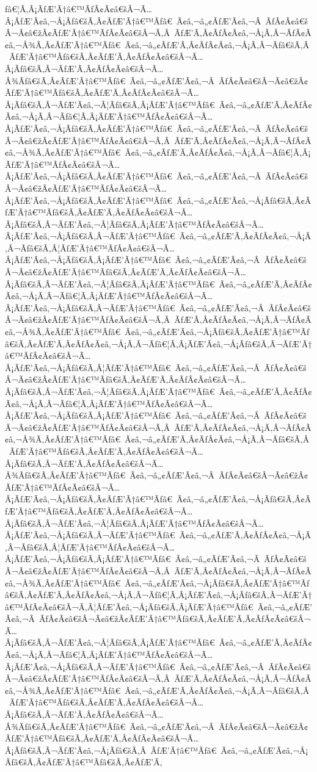 \documentclass{article}
\begin{document}
\begin{outline}[enumerate]
ƒâ€¦Ã‚Â¡ÃƒÆ’Ã†â€™ÃƒÂ¢Ã¢â€šÂ¬Ã…Â¡ÃƒÆ’Ã¢â‚¬Å¡Ãƒâ€šÃ‚Â¢ÃƒÆ’Ã†â€™Ãƒâ€ Ã¢â‚¬â„¢ÃƒÆ’Ã¢â‚¬Â ÃƒÂ¢Ã¢â€šÂ¬Ã¢â€žÂ¢ÃƒÆ’Ã†â€™ÃƒÂ¢Ã¢â€šÂ¬Ã‚Â ÃƒÆ’Ã‚Â¢ÃƒÂ¢Ã¢â‚¬Å¡Ã‚Â¬ÃƒÂ¢Ã¢â‚¬Å¾Ã‚Â¢ÃƒÆ’Ã†â€™Ãƒâ€ Ã¢â‚¬â„¢ÃƒÆ’Ã‚Â¢ÃƒÂ¢Ã¢â‚¬Å¡Ã‚Â¬Ãƒâ€šÃ‚Â ÃƒÆ’Ã†â€™Ãƒâ€šÃ‚Â¢ÃƒÆ’Ã‚Â¢ÃƒÂ¢Ã¢â€šÂ¬Ã…Â¡Ãƒâ€šÃ‚Â¬ÃƒÆ’Ã‚Â¢ÃƒÂ¢Ã¢â€šÂ¬Ã…Â¾Ãƒâ€šÃ‚Â¢ÃƒÆ’Ã†â€™Ãƒâ€ Ã¢â‚¬â„¢ÃƒÆ’Ã¢â‚¬Â ÃƒÂ¢Ã¢â€šÂ¬Ã¢â€žÂ¢ÃƒÆ’Ã†â€™Ãƒâ€šÃ‚Â¢ÃƒÆ’Ã‚Â¢ÃƒÂ¢Ã¢â€šÂ¬Ã…Â¡Ãƒâ€šÃ‚Â¬ÃƒÆ’Ã¢â‚¬Â¦Ãƒâ€šÃ‚Â¡ÃƒÆ’Ã†â€™Ãƒâ€ Ã¢â‚¬â„¢ÃƒÆ’Ã‚Â¢ÃƒÂ¢Ã¢â‚¬Å¡Ã‚Â¬Ãƒâ€¦Ã‚Â¡ÃƒÆ’Ã†â€™ÃƒÂ¢Ã¢â€šÂ¬Ã…Â¡ÃƒÆ’Ã¢â‚¬Å¡Ãƒâ€šÃ‚Â¢ÃƒÆ’Ã†â€™Ãƒâ€ Ã¢â‚¬â„¢ÃƒÆ’Ã¢â‚¬Â ÃƒÂ¢Ã¢â€šÂ¬Ã¢â€žÂ¢ÃƒÆ’Ã†â€™ÃƒÂ¢Ã¢â€šÂ¬Ã‚Â ÃƒÆ’Ã‚Â¢ÃƒÂ¢Ã¢â‚¬Å¡Ã‚Â¬ÃƒÂ¢Ã¢â‚¬Å¾Ã‚Â¢ÃƒÆ’Ã†â€™Ãƒâ€ Ã¢â‚¬â„¢ÃƒÆ’Ã‚Â¢ÃƒÂ¢Ã¢â‚¬Å¡Ã‚Â¬Ãƒâ€¦Ã‚Â¡ÃƒÆ’Ã†â€™ÃƒÂ¢Ã¢â€šÂ¬Ã…Â¡ÃƒÆ’Ã¢â‚¬Å¡Ãƒâ€šÃ‚Â¢ÃƒÆ’Ã†â€™Ãƒâ€ Ã¢â‚¬â„¢ÃƒÆ’Ã¢â‚¬Â ÃƒÂ¢Ã¢â€šÂ¬Ã¢â€žÂ¢ÃƒÆ’Ã†â€™ÃƒÂ¢Ã¢â€šÂ¬Ã…Â¡ÃƒÆ’Ã¢â‚¬Å¡Ãƒâ€šÃ‚Â¢ÃƒÆ’Ã†â€™Ãƒâ€ Ã¢â‚¬â„¢ÃƒÆ’Ã¢â‚¬Å¡Ãƒâ€šÃ‚Â¢ÃƒÆ’Ã†â€™Ãƒâ€šÃ‚Â¢ÃƒÆ’Ã‚Â¢ÃƒÂ¢Ã¢â€šÂ¬Ã…Â¡Ãƒâ€šÃ‚Â¬ÃƒÆ’Ã¢â‚¬Â¦Ãƒâ€šÃ‚Â¡ÃƒÆ’Ã†â€™ÃƒÂ¢Ã¢â€šÂ¬Ã…Â¡ÃƒÆ’Ã¢â‚¬Å¡Ãƒâ€šÃ‚Â¬ÃƒÆ’Ã†â€™Ãƒâ€ Ã¢â‚¬â„¢ÃƒÆ’Ã‚Â¢ÃƒÂ¢Ã¢â‚¬Å¡Ã‚Â¬Ãƒâ€šÃ‚Â¦ÃƒÆ’Ã†â€™ÃƒÂ¢Ã¢â€šÂ¬Ã…Â¡ÃƒÆ’Ã¢â‚¬Å¡Ãƒâ€šÃ‚Â¡ÃƒÆ’Ã†â€™Ãƒâ€ Ã¢â‚¬â„¢ÃƒÆ’Ã¢â‚¬Â ÃƒÂ¢Ã¢â€šÂ¬Ã¢â€žÂ¢ÃƒÆ’Ã†â€™Ãƒâ€šÃ‚Â¢ÃƒÆ’Ã‚Â¢ÃƒÂ¢Ã¢â€šÂ¬Ã…Â¡Ãƒâ€šÃ‚Â¬ÃƒÆ’Ã¢â‚¬Â¦Ãƒâ€šÃ‚Â¡ÃƒÆ’Ã†â€™Ãƒâ€ Ã¢â‚¬â„¢ÃƒÆ’Ã‚Â¢ÃƒÂ¢Ã¢â‚¬Å¡Ã‚Â¬Ãƒâ€¦Ã‚Â¡ÃƒÆ’Ã†â€™ÃƒÂ¢Ã¢â€šÂ¬Ã…Â¡ÃƒÆ’Ã¢â‚¬Å¡Ãƒâ€šÃ‚Â¬ÃƒÆ’Ã†â€™Ãƒâ€ Ã¢â‚¬â„¢ÃƒÆ’Ã¢â‚¬Â ÃƒÂ¢Ã¢â€šÂ¬Ã¢â€žÂ¢ÃƒÆ’Ã†â€™ÃƒÂ¢Ã¢â€šÂ¬Ã‚Â ÃƒÆ’Ã‚Â¢ÃƒÂ¢Ã¢â‚¬Å¡Ã‚Â¬ÃƒÂ¢Ã¢â‚¬Å¾Ã‚Â¢ÃƒÆ’Ã†â€™Ãƒâ€ Ã¢â‚¬â„¢ÃƒÆ’Ã¢â‚¬Å¡Ãƒâ€šÃ‚Â¢ÃƒÆ’Ã†â€™Ãƒâ€šÃ‚Â¢ÃƒÆ’Ã‚Â¢ÃƒÂ¢Ã¢â‚¬Å¡Ã‚Â¬Ãƒâ€¦Ã‚Â¡ÃƒÆ’Ã¢â‚¬Å¡Ãƒâ€šÃ‚Â¬ÃƒÆ’Ã†â€™ÃƒÂ¢Ã¢â€šÂ¬Ã…Â¡ÃƒÆ’Ã¢â‚¬Å¡Ãƒâ€šÃ‚Â¦ÃƒÆ’Ã†â€™Ãƒâ€ Ã¢â‚¬â„¢ÃƒÆ’Ã¢â‚¬Â ÃƒÂ¢Ã¢â€šÂ¬Ã¢â€žÂ¢ÃƒÆ’Ã†â€™Ãƒâ€šÃ‚Â¢ÃƒÆ’Ã‚Â¢ÃƒÂ¢Ã¢â€šÂ¬Ã…Â¡Ãƒâ€šÃ‚Â¬ÃƒÆ’Ã¢â‚¬Â¦Ãƒâ€šÃ‚Â¡ÃƒÆ’Ã†â€™Ãƒâ€ Ã¢â‚¬â„¢ÃƒÆ’Ã‚Â¢ÃƒÂ¢Ã¢â‚¬Å¡Ã‚Â¬Ãƒâ€¦Ã‚Â¡ÃƒÆ’Ã†â€™ÃƒÂ¢Ã¢â€šÂ¬Ã…Â¡ÃƒÆ’Ã¢â‚¬Å¡Ãƒâ€šÃ‚Â¡ÃƒÆ’Ã†â€™Ãƒâ€ Ã¢â‚¬â„¢ÃƒÆ’Ã¢â‚¬Â ÃƒÂ¢Ã¢â€šÂ¬Ã¢â€žÂ¢ÃƒÆ’Ã†â€™ÃƒÂ¢Ã¢â€šÂ¬Ã‚Â ÃƒÆ’Ã‚Â¢ÃƒÂ¢Ã¢â‚¬Å¡Ã‚Â¬ÃƒÂ¢Ã¢â‚¬Å¾Ã‚Â¢ÃƒÆ’Ã†â€™Ãƒâ€ Ã¢â‚¬â„¢ÃƒÆ’Ã‚Â¢ÃƒÂ¢Ã¢â‚¬Å¡Ã‚Â¬Ãƒâ€šÃ‚Â ÃƒÆ’Ã†â€™Ãƒâ€šÃ‚Â¢ÃƒÆ’Ã‚Â¢ÃƒÂ¢Ã¢â€šÂ¬Ã…Â¡Ãƒâ€šÃ‚Â¬ÃƒÆ’Ã‚Â¢ÃƒÂ¢Ã¢â€šÂ¬Ã…Â¾Ãƒâ€šÃ‚Â¢ÃƒÆ’Ã†â€™Ãƒâ€ Ã¢â‚¬â„¢ÃƒÆ’Ã¢â‚¬Â ÃƒÂ¢Ã¢â€šÂ¬Ã¢â€žÂ¢ÃƒÆ’Ã†â€™ÃƒÂ¢Ã¢â€šÂ¬Ã…Â¡ÃƒÆ’Ã¢â‚¬Å¡Ãƒâ€šÃ‚Â¢ÃƒÆ’Ã†â€™Ãƒâ€ Ã¢â‚¬â„¢ÃƒÆ’Ã¢â‚¬Å¡Ãƒâ€šÃ‚Â¢ÃƒÆ’Ã†â€™Ãƒâ€šÃ‚Â¢ÃƒÆ’Ã‚Â¢ÃƒÂ¢Ã¢â€šÂ¬Ã…Â¡Ãƒâ€šÃ‚Â¬ÃƒÆ’Ã¢â‚¬Â¦Ãƒâ€šÃ‚Â¡ÃƒÆ’Ã†â€™ÃƒÂ¢Ã¢â€šÂ¬Ã…Â¡ÃƒÆ’Ã¢â‚¬Å¡Ãƒâ€šÃ‚Â¬ÃƒÆ’Ã†â€™Ãƒâ€ Ã¢â‚¬â„¢ÃƒÆ’Ã‚Â¢ÃƒÂ¢Ã¢â‚¬Å¡Ã‚Â¬Ãƒâ€šÃ‚Â¦ÃƒÆ’Ã†â€™ÃƒÂ¢Ã¢â€šÂ¬Ã…Â¡ÃƒÆ’Ã¢â‚¬Å¡Ãƒâ€šÃ‚Â¡ÃƒÆ’Ã†â€™Ãƒâ€ Ã¢â‚¬â„¢ÃƒÆ’Ã¢â‚¬Â ÃƒÂ¢Ã¢â€šÂ¬Ã¢â€žÂ¢ÃƒÆ’Ã†â€™ÃƒÂ¢Ã¢â€šÂ¬Ã‚Â ÃƒÆ’Ã‚Â¢ÃƒÂ¢Ã¢â‚¬Å¡Ã‚Â¬ÃƒÂ¢Ã¢â‚¬Å¾Ã‚Â¢ÃƒÆ’Ã†â€™Ãƒâ€ Ã¢â‚¬â„¢ÃƒÆ’Ã¢â‚¬Å¡Ãƒâ€šÃ‚Â¢ÃƒÆ’Ã†â€™Ãƒâ€šÃ‚Â¢ÃƒÆ’Ã‚Â¢ÃƒÂ¢Ã¢â‚¬Å¡Ã‚Â¬Ãƒâ€¦Ã‚Â¡ÃƒÆ’Ã¢â‚¬Å¡Ãƒâ€šÃ‚Â¬ÃƒÆ’Ã†â€™ÃƒÂ¢Ã¢â€šÂ¬Ã‚Â¦ÃƒÆ’Ã¢â‚¬Å¡Ãƒâ€šÃ‚Â¡ÃƒÆ’Ã†â€™Ãƒâ€ Ã¢â‚¬â„¢ÃƒÆ’Ã¢â‚¬Â ÃƒÂ¢Ã¢â€šÂ¬Ã¢â€žÂ¢ÃƒÆ’Ã†â€™Ãƒâ€šÃ‚Â¢ÃƒÆ’Ã‚Â¢ÃƒÂ¢Ã¢â€šÂ¬Ã…Â¡Ãƒâ€šÃ‚Â¬ÃƒÆ’Ã¢â‚¬Â¦Ãƒâ€šÃ‚Â¡ÃƒÆ’Ã†â€™Ãƒâ€ Ã¢â‚¬â„¢ÃƒÆ’Ã‚Â¢ÃƒÂ¢Ã¢â‚¬Å¡Ã‚Â¬Ãƒâ€¦Ã‚Â¡ÃƒÆ’Ã†â€™ÃƒÂ¢Ã¢â€šÂ¬Ã…Â¡ÃƒÆ’Ã¢â‚¬Å¡Ãƒâ€šÃ‚Â¬ÃƒÆ’Ã†â€™Ãƒâ€ Ã¢â‚¬â„¢ÃƒÆ’Ã¢â‚¬Â ÃƒÂ¢Ã¢â€šÂ¬Ã¢â€žÂ¢ÃƒÆ’Ã†â€™ÃƒÂ¢Ã¢â€šÂ¬Ã‚Â ÃƒÆ’Ã‚Â¢ÃƒÂ¢Ã¢â‚¬Å¡Ã‚Â¬ÃƒÂ¢Ã¢â‚¬Å¾Ã‚Â¢ÃƒÆ’Ã†â€™Ãƒâ€ Ã¢â‚¬â„¢ÃƒÆ’Ã‚Â¢ÃƒÂ¢Ã¢â‚¬Å¡Ã‚Â¬Ãƒâ€šÃ‚Â ÃƒÆ’Ã†â€™Ãƒâ€šÃ‚Â¢ÃƒÆ’Ã‚Â¢ÃƒÂ¢Ã¢â€šÂ¬Ã…Â¡Ãƒâ€šÃ‚Â¬ÃƒÆ’Ã‚Â¢ÃƒÂ¢Ã¢â€šÂ¬Ã…Â¾Ãƒâ€šÃ‚Â¢ÃƒÆ’Ã†â€™Ãƒâ€ Ã¢â‚¬â„¢ÃƒÆ’Ã¢â‚¬Â ÃƒÂ¢Ã¢â€šÂ¬Ã¢â€žÂ¢ÃƒÆ’Ã†â€™Ãƒâ€šÃ‚Â¢ÃƒÆ’Ã‚Â¢ÃƒÂ¢Ã¢â€šÂ¬Ã…Â¡Ãƒâ€šÃ‚Â¬ÃƒÆ’Ã¢â‚¬Å¡Ãƒâ€šÃ‚Â ÃƒÆ’Ã†â€™Ãƒâ€ Ã¢â‚¬â„¢ÃƒÆ’Ã¢â‚¬Å¡Ãƒâ€šÃ‚Â¢ÃƒÆ’Ã†â€™Ãƒâ€šÃ‚Â¢ÃƒÆ’Ã‚
\end{outline}
\end{document}
